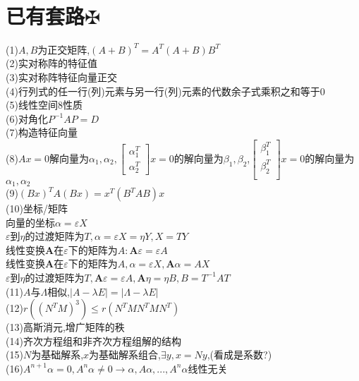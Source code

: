 \documentclass[11pt, a4paper, UTF8]{ctexart}
\begin{document}
\indent\\
\large
\raggedright
\def\fuck{\maltese}
\def\shit#1{#1\protect\hyperlink{catalog}{$\fuck$}}
\hypertarget{catalog}{}
\tableofcontents
\setcounter{secnumdepth}{-1}
\section{\shit{已有套路}}
(1)$A,B$为正交矩阵,$(A+B)^T=A^T(A+B)B^T$\\
(2)实对称阵的特征值\\
(3)实对称阵特征向量正交\\
(4)行列式的任一行(列)元素与另一行(列)元素的代数余子式乘积之和等于0\\
(5)线性空间8性质\\
(6)对角化$P^{-1}AP=D$\\
(7)构造特征向量\\
(8)$Ax=0$解向量为$\alpha_1,\alpha_2,\begin{bmatrix}
\alpha_1^T\\
\alpha_2^T
\end{bmatrix}x=0$的解向量为$\beta_1,\beta_2$,$\begin{bmatrix}
\beta_1^T\\
\beta_2^T\\
\end{bmatrix}x=0$的解向量为$\alpha_1,\alpha_2$\\
(9)$(Bx)^TA(Bx)=x^T(B^TAB)x$\\
(10)坐标/矩阵\\
向量的坐标$\alpha=\varepsilon X$\\
$\varepsilon$到$\eta$的过渡矩阵为$T,\alpha=\varepsilon X=\eta Y,X=TY$\\
线性变换$\bm A$在$\varepsilon$下的矩阵为$A:\bm A\varepsilon=\varepsilon A$\\
线性变换$\bm A$在$\varepsilon$下的矩阵为$A,\alpha=\varepsilon X,\bm A\alpha=AX$\\
$\varepsilon$到$\eta$的过渡矩阵为$T,\bm A\varepsilon=\varepsilon A,\bm A\eta=\eta B,B=T^{-1}AT$\\
(11)$A$与$\varLambda$相似,$|A-\lambda E|=|\varLambda-\lambda E|$\\
(12)$r((N^TM)^3)\le r(N^TMN^TMN^T)$\\
(13)高斯消元,增广矩阵的秩\\
(14)齐次方程组和非齐次方程组解的结构\\
(15)$N$为基础解系,$x$为基础解系组合,$\exists y,x=Ny$,(看成是系数?)\\
(16)$A^{n+1}\alpha=0,A^n\alpha\not=0\to\alpha,A\alpha,...,A^n\alpha$线性无关\\
\end{document}
